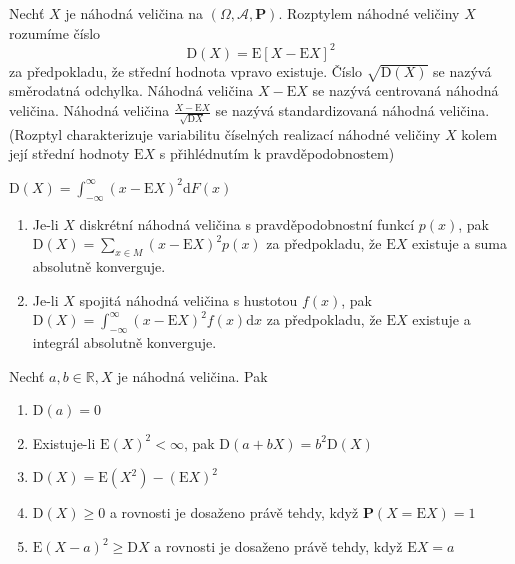 \begin{definition}
Nechť $X$ je náhodná veličina na $(\Omega,\mathcal{A},\textbf{P})$. Rozptylem náhodné veličiny $X$ rozumíme číslo 
\begin{equation}
\mathrm{D}(X)=\mathrm{E}[X-\mathrm{E} X]^2
\end{equation}
za předpokladu, že střední hodnota vpravo existuje. Číslo $\sqrt{\mathrm{D}(X)}$ se nazývá směrodatná odchylka. Náhodná veličina $X-\mathrm{E} X$ se nazývá centrovaná náhodná veličina. Náhodná veličina $\frac{X-\mathrm{E}X}{\sqrt{\mathrm{D}X}}$ se nazývá standardizovaná náhodná veličina. (Rozptyl charakterizuje variabilitu číselných realizací náhodné veličiny $X$ kolem její střední hodnoty $\mathrm{E}X$ s přihlédnutím k pravděpodobnostem)
\end{definition}

\begin{dusledek}
$\mathrm{D}(X)=\int_{-\infty}^{\infty}(x-\mathrm{E}X)^2\mathrm{d}F(x)$
\begin{enumerate}
\item Je-li $X$ diskrétní náhodná veličina s pravděpodobnostní funkcí $p(x)$, pak $\mathrm{D}(X)=\sum_{x\in M}(x-\mathrm{E}X)^2p(x)$ za předpokladu, že $\mathrm{E}X$ existuje a suma absolutně konverguje.
\item 
Je-li $X$ spojitá náhodná veličina s hustotou $f(x)$, pak $\mathrm{D}(X)=\int_{-\infty}^{\infty}(x-\mathrm{E}X)^2f(x)\mathrm{d}x$ za předpokladu, že $\mathrm{E}X$ existuje a integrál absolutně konverguje.
\end{enumerate}
\end{dusledek}

\begin{theorem}
Nechť $a,b \in \mathbb{R}, X$ je náhodná veličina. Pak
\begin{enumerate}
\item $\mathrm{D}(a)=0$
\item Existuje-li $\mathrm{E}(X)^2< \infty$, pak $\mathrm{D}(a+bX)=b^2\mathrm{D}(X)$
\item $\mathrm{D}(X)=\mathrm{E}(X^2)-(\mathrm{E}X)^2$
\item $\mathrm{D}(X)\geq 0$ a rovnosti je dosaženo právě tehdy, když $\textbf{P}(X=\mathrm{E}X)=1$
\item $\mathrm{E}(X-a)^2 \geq \mathrm{D}X$ a rovnosti je dosaženo právě tehdy, když $\mathrm{E}X=a$ 
\end{enumerate}
\end{theorem}

